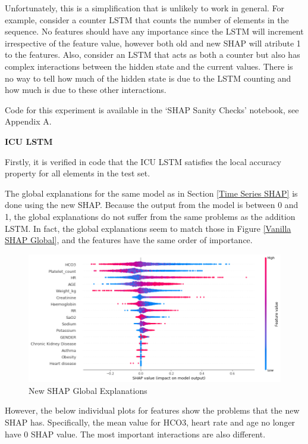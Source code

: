 \documentclass[12pt]{article}
\begin{document}
Unfortunately, this is a simplification that is unlikely to work in general. For example, consider a counter LSTM that counts the number of elements in the sequence. No features should have any importance since the LSTM will increment irrespective of the feature value, however both old and new SHAP will atribute 1 to the features. Also, consider an LSTM that acts as both a counter but also has complex interactions between the hidden state and the current values. There is no way to tell how much of the hidden state is due to the LSTM counting and how much is due to these other interactions.

Code for this experiment is available in the `SHAP Sanity Checks' notebook, see Appendix A.

\textbf{ICU LSTM}

Firstly, it is verified in code that the ICU LSTM satisfies the local accuracy property for all elements in the test set. 

The global explanations for the same model as in Section \ref{Time Series SHAP} is done using the new SHAP. Because the output from the model is between 0 and 1, the global explanations do not suffer from the same problems as the addition LSTM. In fact, the global explanations seem to match those in Figure \ref{Vanilla SHAP Global}, and the features have the same order of importance. 

\begin{figure}[H]
\centering\caption{New SHAP Global Explanations}
\includegraphics[scale=0.35]{New SHAP Global.png}
\end{figure}

However, the below individual plots for features show the problems that the new SHAP has. Specifically, the mean value for HCO3, heart rate and age no longer have 0 SHAP value. The most important interactions are also different.
\end{document}
